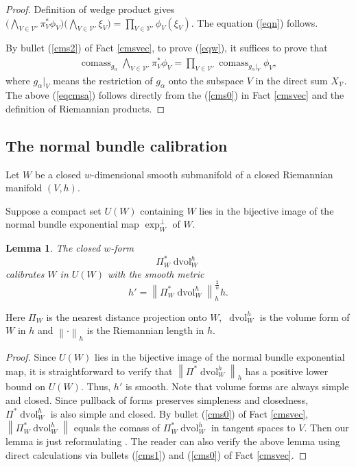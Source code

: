 \documentclass[11pt,a4paper]{amsart}
\numberwithin{equation}{section}
\newcommand{\ai}{\alpha}
\newcommand{\cms}{\operatorname{comass}}
\newcommand{\no}[1]{\left\lVert#1\right\rVert}
\newcommand{\dvol}{\operatorname{dvol}}
\newcommand{\du}{^\ast}
\theoremstyle{plain}
\newtheorem{lem}[exam]{Lemma}
\theoremstyle{definition}
\numberwithin{equation}{subsection}
\begin{document}
\begin{proof}
Definition of wedge product gives$\bigg(\bigwedge_{V\in \mathcal{V}'}\pi_V\du\phi_V\bigg)\bigg(\bigwedge_{V\in \mathcal{V}'}{\xi_V}\bigg)=\prod_{V\in \mathcal{V}'}\phi_V(\xi_V).$ The equation (\ref{eqn}) follows.
	
By bullet (\ref{cms2}) of Fact \ref{cmsvec}, to prove (\ref{eqw}), it suffices to prove that
\begin{align}\label{eqcmsa}
	\cms_{g_\ai}	\bigwedge_{V\in \mathcal{V}'}\pi_V\du\phi_V=\prod_{V\in \mathcal{V}'}\cms_{g_\ai|_{V}}\phi_V,
\end{align}where $g_\ai|_{V}$ means the restriction of $g_\ai$ onto the subspace $V$ in the direct sum $X_{\mathcal{V}}$. The above (\ref{eqcmsa}) follows directly from the (\ref{cms0}) in Fact \ref{cmsvec} and the definition of Riemannian products.
\end{proof}
\subsection{The normal bundle calibration}\label{secnb}
Let $W$ be a closed $w$-dimensional smooth submanifold of a closed Riemannian manifold $(V,h).$

Suppose a compact set $U(W)$ containing $W$ lies in the bijective image of the normal bundle exponential map $\exp^\perp_W$ of $W.$
\begin{lem}\label{lemznb}
The closed $w$-form $$\Pi_W\du\dvol_W^h$$ calibrates $W$ in $U(W)$ with the smooth metric $$h'=\no{\Pi_W\du\dvol_W^h}_h^{\frac{2}{w}}h.$$
\end{lem}
Here $\Pi_W$ is the nearest distance projection onto $W,$ $\dvol_W^h$ is the volume form of $W$ in $h$ and $\no{\cdot}_h$ is the Riemannian length in $h.$
\begin{proof}
	Since $U(W)$ lies in the bijective image of the normal bundle exponential map, it is straightforward to verify that $\no{\Pi\du\dvol_W^h}_h$ has a positive lower bound on $U(W).$ Thus, $h'$ is smooth. Note that volume forms are always simple and closed. Since pullback of forms preserves simpleness and closedness, $\Pi\du\dvol_W^h$ is also simple and closed. By bullet (\ref{cms0}) of Fact \ref{cmsvec}, $\no{\Pi\du_W\dvol_W^h}$ equals the comass of $\Pi\du_W\dvol_W^h$ in tangent spaces to $V.$ Then our lemma is just reformulating \cite[Remark 3.5 and Lemma 3.4 ]{YZa}.	The reader can also verify the above lemma using direct calculations via bullets (\ref{cms1}) and (\ref{cms0}) of Fact \ref{cmsvec}.\end{proof}
\end{document}
